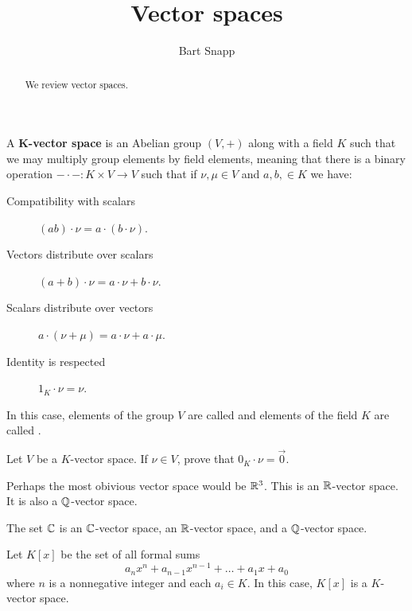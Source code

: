 \documentclass{ximera}
\author{Bart Snapp}
\title{Vector spaces}
\begin{document}
\begin{abstract}
  We review vector spaces.
\end{abstract}
\maketitle



\begin{definition}
  A \textbf{$\boldsymbol{K}$-vector space} is an Abelian group $(V,+)$
  along with a field $K$ such that we may multiply group elements by
  field elements, meaning that there is a binary operation $-\cdot-:
  K\times V \to V$ such that if $\nu,\mu\in V$ and $a,b,\in K$ we
  have:
\begin{description}
\item[Compatibility with scalars] $(ab)\cdot \nu = a\cdot (b\cdot \nu)$.
\item[Vectors distribute over scalars] $(a+b)\cdot \nu =
  a\cdot\nu + b\cdot \nu$.
\item[Scalars distribute over vectors] $a\cdot (\nu+\mu) =
  a\cdot \nu + a\cdot \mu$.
\item[Identity is respected] $1_K\cdot \nu = \nu$.
\end{description}
In this case, elements of the group $V$ are called  and
elements of the field $K$ are called .
\end{definition}

\begin{exercise}
  Let $V$ be a $K$-vector space. If $\nu\in V$, prove that
  $0_K\cdot \nu = \vec{0}$.
\end{exercise}


\begin{example}
  Perhaps the most obivious vector space would be $\mathbb R^3$. This is an
  $\mathbb R$-vector space. It is also a $\mathbb Q$-vector space.
\end{example}



\begin{example}
  The set $\mathbb C$ is an $\mathbb C$-vector space, an $\mathbb R$-vector space, and a
  $\mathbb Q$-vector space.
\end{example}


\begin{example}[Polynomials]
  Let $K[x]$ be the set of all formal sums
  \[
  a_nx^n + a_{n-1}x^{n-1} + \dots + a_1 x + a_0
  \]
  where $n$ is a nonnegative integer and each $a_i \in K$. In this
  case, $K[x]$ is a $K$-vector space.
\end{example}
\end{document}
